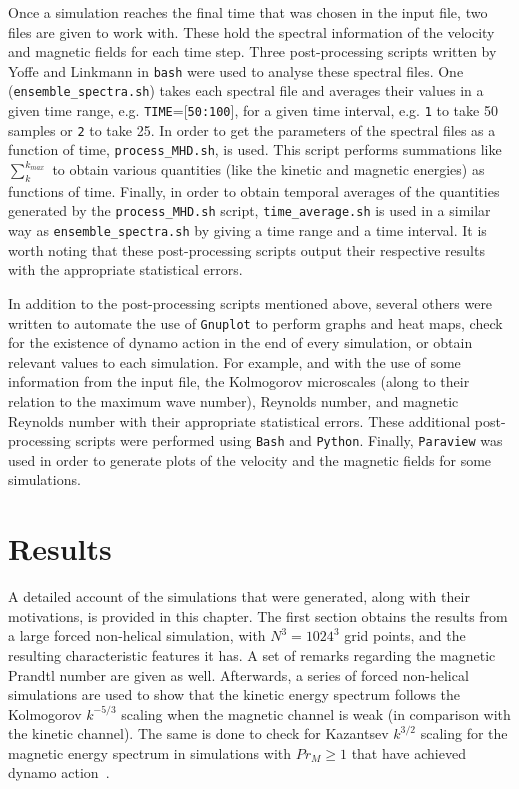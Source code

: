 \documentclass[12pt,a4paper]{report}
\begin{document}
Once a simulation reaches the final time that was chosen in the input file, two files are given to work with. These hold the spectral information of the velocity and magnetic fields for each time step. Three post-processing scripts written by Yoffe and Linkmann in \texttt{bash} were used to analyse these spectral files. One (\texttt{ensemble\_spectra.sh}) takes each spectral file and averages their values in a given time range, e.g. \texttt{TIME}=[\texttt{50:100}], for a given time interval, e.g. \texttt{1} to take 50 samples or \texttt{2} to take 25. In order to get the parameters of the spectral files as a function of time, \texttt{process\_MHD.sh}, is used. This script performs summations like $\sum_k^{k_{max}}$ to obtain various quantities (like the kinetic and magnetic energies) as functions of time. Finally, in order to obtain temporal averages of the quantities generated by the \texttt{process\_MHD.sh} script, \texttt{time\_average.sh} is used in a similar way as \texttt{ensemble\_spectra.sh} by giving a time range and a time interval. It is worth noting that these post-processing scripts output their respective results with the appropriate statistical errors.

In addition to the post-processing scripts mentioned above, several others were written to automate the use of \texttt{Gnuplot} to perform graphs and heat maps, check for the existence of dynamo action in the end of every simulation, or obtain relevant values to each simulation. For example, and with the use of some information from the input file, the Kolmogorov microscales (along to their relation to the maximum wave number), Reynolds number, and magnetic Reynolds number with their appropriate statistical errors. These additional post-processing scripts were performed using \texttt{Bash} and \texttt{Python}. Finally, \texttt{Paraview} was used in order to generate plots of the velocity and the magnetic fields for some simulations. 















\chapter{Results}

A detailed account of the simulations that were generated, along with their motivations, is provided in this chapter. The first section obtains the results from a large forced non-helical simulation, with $N^3=1024^3$ grid points, and the resulting characteristic features it has. A set of remarks regarding the magnetic Prandtl number are given as well. Afterwards, a series of forced non-helical simulations are used to show that the kinetic energy spectrum follows the Kolmogorov $k^{-5/3}$ scaling when the magnetic channel is weak (in comparison with the kinetic channel). The same is done to check for Kazantsev $k^{3/2}$ scaling for the magnetic energy spectrum in simulations with $Pr_M \geq 1$ that have achieved dynamo action~\cite{haugen2004simulations}. 
\end{document}
